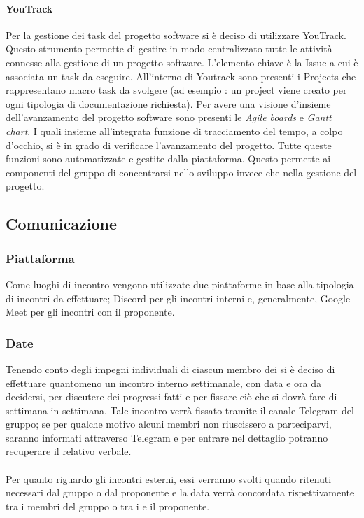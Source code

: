 \paragraph{YouTrack}
Per la gestione dei task del progetto software si è deciso di utilizzare YouTrack\glo{}.
Questo strumento permette di gestire in modo centralizzato tutte le attività connesse alla
gestione di un progetto software. L'elemento chiave è la Issue\glo{} a cui è associata un task da eseguire.
All'interno di Youtrack sono presenti i Projects che rappresentano macro task da svolgere (ad esempio : un project viene creato per ogni tipologia di documentazione richiesta).
Per avere una visione d'insieme dell'avanzamento del progetto software sono presenti le \textit{Agile boards}\glo{} e \textit{Gantt chart}\glo{}. I quali insieme all'integrata funzione di tracciamento del tempo, a colpo d'occhio, si è in grado di verificare l'avanzamento del progetto.
Tutte queste funzioni sono automatizzate e gestite dalla piattaforma. Questo permette ai componenti del gruppo di concentrarsi nello sviluppo invece che nella gestione del progetto.

\subsection{Comunicazione}
\subsubsection{Piattaforma}
Come luoghi di incontro vengono utilizzate due piattaforme in base alla tipologia di incontri da effettuare; Discord\glo{} per gli incontri interni e, generalmente, Google Meet\glo{} per gli incontri con il proponente.

\subsubsection{Date}
Tenendo conto degli impegni individuali di ciascun membro dei \groupName{} si è deciso di effettuare quantomeno un incontro interno settimanale, con data e ora da decidersi, per discutere dei progressi fatti e per fissare ciò che si dovrà fare di settimana in settimana. Tale incontro verrà fissato tramite il canale Telegram\glo{} del gruppo; se per qualche motivo alcuni membri non riuscissero a parteciparvi, saranno informati attraverso Telegram e per entrare nel dettaglio potranno recuperare il relativo verbale.
\\ \\
Per quanto riguardo gli incontri esterni, essi verranno svolti quando ritenuti necessari dal gruppo o dal proponente e la data verrà concordata rispettivamente tra i membri del gruppo o tra i \groupName{} e il proponente. 

